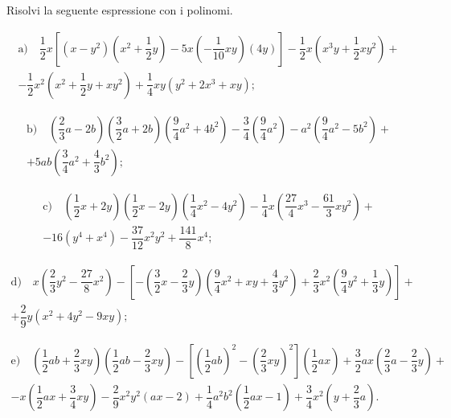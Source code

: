 \begin{esercizio}[\Ast] %
	\label{ese:11.51}
	Risolvi la seguente espressione con i polinomi.
	
	 	\begin{multline*}
			\text{a)} \quad \dfrac{1}{2}x\left[\left(x-y^{2}\right)\left(x^{2}+\dfrac{1}{2}y\right)-5x\left(-{\dfrac{1}{10}}{xy}\right)(4y)\right]-\dfrac{1}{2}x\left(x^{3}y+\dfrac{1}{2}xy^{2}\right)+\\
			-\dfrac{1}{2}x^{2}\left(x^{2}+\dfrac{1}{2}y+{xy}^{2}\right)+\dfrac{1}{4}{xy}\left(y^{2}+2x^{3}+{xy}\right);
		\end{multline*}
		
		\begin{multline*}
			\text{b)}\quad \left(\dfrac{2}{3}a-2b\right)\left(\dfrac{3}{2}a+2b\right)\left(\dfrac{9}{4}a^{2}+4b^{2}\right)-\dfrac{3}{4}\left(\dfrac{9}{4}a^{2}\right)-a^{2}\left(\dfrac{9}{4}a^{2}-5b^{2}\right)+\\
			+5{ab}\left(\dfrac{3}{4}a^{2}+\dfrac{4}{3}b^{2}\right);
		\end{multline*}
		
		\begin{multline*}
			\text{c)}\quad \left(\dfrac{1}{2}x+2y\right)\left(\dfrac{1}{2}x-2y\right)\left(\dfrac{1}{4}x^{2}-4y^{2}\right)-\dfrac{1}{4}x\left(\dfrac{27}{4}x^{3}-\dfrac{61}{3}xy^{2}\right)+\\
			-16\left(y^{4}+x^{4}\right)-\dfrac{37}{12}x^{2}y^{2}+\dfrac{141}{8}x^{4};
		\end{multline*}
		
		\begin{multline*}
			\text{d)}\quad x\left(\dfrac{2}{3}y^{2}-\dfrac{27}{8}x^{2}\right)-\left[-\left(\dfrac{3}{2}x-\dfrac{2}{3}y\right)\left(\dfrac{9}{4}x^{2}+xy+\dfrac{4}{3}y^{2}\right)+\dfrac{2}{3}x^{2}\left(\dfrac{9}{4}y^{2}+\dfrac{1}{3}y\right)\right]+\\
			+\dfrac{2}{9}y\left(x^{2}+4y^{2}-9xy\right);
		\end{multline*}
		
		\begin{multline*}
			\text{e)}\quad \left(\dfrac{1}{2}ab+\dfrac{2}{3}xy\right)\left(\dfrac{1}{2}ab-\dfrac{2}{3}xy\right)-\left[\left(\dfrac{1}{2}ab\right)^{2}-\left(\dfrac{2}{3}xy\right)^{2}\right]\left(\dfrac{1}{2}ax\right)+\dfrac{3}{2}ax\left(\dfrac{2}{3}a-\dfrac{2}{3}y\right)+\\
			-x\left(\dfrac{1}{2}ax+\dfrac{3}{4}xy\right)-\dfrac{2}{9}x^{2}y^{2}(ax-2)+\dfrac{1}{4}a^{2}b^{2}\left(\dfrac{1}{2}ax-1\right)+\dfrac{3}{4}x^{2}\left(y+\dfrac{2}{3}a\right).
		\end{multline*}
	\end{esercizio}


